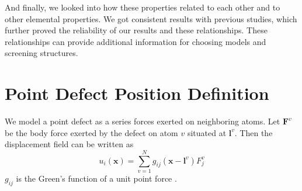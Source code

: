 \documentclass[%
 reprint,
 amsmath,amssymb,
 aps,
]{revtex4-1}
\begin{document}
And finally, we looked into how these properties related to each other and to other elemental properties.
We got consistent results with previous studies, which further proved the reliability of our results and these relationships.
These relationships can provide additional information for choosing models and screening structures.

%
%
%
%

\appendix
\section{Point Defect Position Definition}
\label{app:position}
We model a point defect as a series forces exerted on neighboring atoms.
Let $\bm{F}^{v}$ be the body force exerted by the defect on atom $v$ situated at $\bm{l}^v$.
Then the displacement field can be written as
\begin{equation}
u_i(\bm{x}) = \sum_{v=1}^{N} g_{ij}(\bm{x}-\bm{l}^v) F_j^v
\end{equation}
$g_{ij}$ is the Green's function of a unit point force \cite{seifmultipolar,ting1997three}.
\end{document}
